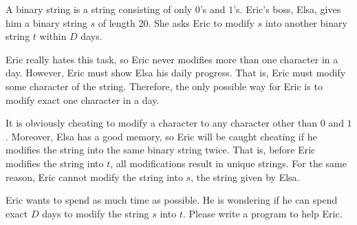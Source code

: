 A binary string is a string consisting of only $0$'s and $1$'s. 
Eric's boss, Elsa, gives him a binary string $s$ of length 20.
She asks Eric to modify $s$ into another binary string $t$ within $D$ days.

Eric really hates this task, so Eric never modifies more than one character in 
a day.
However, Eric must show Elsa his daily progress.
That is, Eric must modify some character of the string.
Therefore, the only possible way for Eric is to modify exact one character in 
a day.

It is obviously cheating to modify a character to any character other than $0$ 
and $1$.
Moreover, Elsa has a good memory, so Eric will be caught cheating if 
he modifies the string into the same binary string twice.
That is, before Eric modifies the string into $t$, all modifications result in
unique strings.
For the same reason, Eric cannot modify the string into $s$, the string given by Elsa.

Eric wants to spend as much time as possible. 
He is wondering if he can spend exact $D$ days to modify the string $s$ into $t$.
Please write a program to help Eric.
